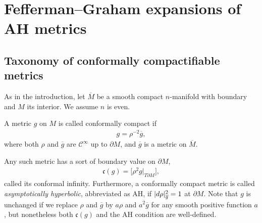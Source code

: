 \documentclass[11pt]{article}
\numberwithin{equation}{section}
\newcommand{\del}{\partial}
\newcommand{\olg}{\overline{g}}
\newcommand{\calC}{\mathcal C}
\newcommand{\Mbar}{\overline{M}}
\begin{document}
\setcounter{section}{1}
\setcounter{subsection}{0}
\setcounter{subsubsection}{0}
\setcounter{Theorem}{2}
\setcounter{equation}{3}
\section{Fefferman--Graham expansions of AH metrics} \label {FGofAH}

\subsection{Taxonomy of conformally compactifiable metrics}
As in the introduction, let $\Mbar$ be a smooth compact $n$-manifold with boundary and $M$ its interior. We assume $n$ is even.

A metric $g$ on $M$ is called conformally compact if
\begin{gather*}%
g = \rho^{-2} \olg ,
\end{gather*}
where both $\rho$ and $\olg$ are $\calC^\infty$ up to $\del M$, and $\olg$ is a metric on $\Mbar$.

Any such metric has a sort of boundary value on $\del M$,
\begin{gather*}%
\mathfrak c(g) = \big[ \rho^2 g \big|_{T\del M} \big],
\end{gather*}
called its conformal infinity. Furthermore, a conformally compact metric is called \emph{asymptotically hyperbolic},
abbreviated as AH, if $|{\rm d}\rho|^2_{\olg} = 1$ at $\del M$. Note that $g$ is unchanged if we replace $\rho$ and $\olg$
by $a\rho$ and $a^2 \olg$ for any smooth positive function $a$, but nonetheless both $\mathfrak c(g)$ and the AH condition are well-defined.
\end{document}
